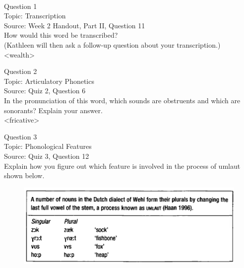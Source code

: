 \documentclass[12pt]{article}
\begin{document}
\newpage

\begin{center}
\textbf{{\color{red}{\HUGE END OF EXAM}}}\\

\end{center}
\newpage

\begin{center}
\textbf{{\color{blue}{\HUGE START OF EXAM\\}}}

\textbf{{\color{blue}{\HUGE Student ID: 90811\\}}}

\textbf{{\color{blue}{\HUGE \\}}}

\end{center}
\newpage

{\large Question 1}\\

Topic: Transcription\\
Source: Week 2 Handout, Part II, Question 11\\

How would this word be transcribed?\\ (Kathleen will then ask a follow-up question about your transcription.)\\

<wealth>


\newpage

{\large Question 2}\\

Topic: Articulatory Phonetics\\
Source: Quiz 2, Question 6\\

In the pronunciation of this word, which sounds are obstruents and which are sonorants? Explain your answer.\\

<fricative>


\newpage

{\large Question 3}\\

Topic: Phonological Features\\
Source: Quiz 3, Question 12\\

Explain how you figure out which feature is involved in the process of umlaut shown below.\\

\begin{figure}[H]
\includegraphics{../images/dutch.png}
\end{figure}
\end{document}
